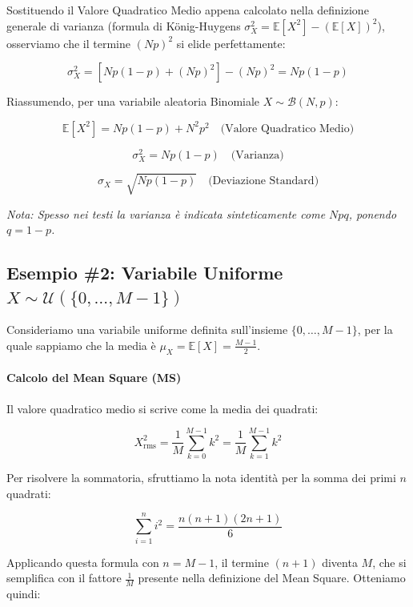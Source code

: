 Sostituendo il Valore Quadratico Medio appena calcolato nella definizione generale di varianza (formula di König-Huygens $\sigma_X^2 = \mathbb{E}[X^2] - (\mathbb{E}[X])^2$), osserviamo che il termine $(Np)^2$ si elide perfettamente:

\[
\sigma_X^2 = \left[ Np(1-p) + (Np)^2 \right] - (Np)^2 = Np(1-p)
\]

Riassumendo, per una variabile aleatoria Binomiale $X \sim \mathcal{B}(N, p)$:

\begin{equation}
\boxed{\mathbb{E}[X^2] = Np(1-p) + N^2 p^2} \quad \text{(Valore Quadratico Medio)}
\end{equation}

\begin{equation}
\boxed{\sigma_X^2 = Np(1-p)} \quad \text{(Varianza)}
\end{equation}

\begin{equation}
\boxed{\sigma_X = \sqrt{Np(1-p)}} \quad \text{(Deviazione Standard)}
\end{equation}

\textit{Nota: Spesso nei testi la varianza è indicata sinteticamente come $Npq$, ponendo $q = 1-p$.}
\subsection{Esempio \#2: Variabile Uniforme $X \sim \mathcal{U}(\{0, \dots, M-1\})$}

Consideriamo una variabile uniforme definita sull'insieme $\{0, \dots, M-1\}$, per la quale sappiamo che la media è $\mu_X = \mathbb{E}[X] = \frac{M-1}{2}$.

\paragraph{Calcolo del Mean Square (MS)}
Il valore quadratico medio si scrive come la media dei quadrati:

\[
X^2_{\text{rms}} = \frac{1}{M} \sum_{k=0}^{M-1} k^2 = \frac{1}{M} \sum_{k=1}^{M-1} k^2
\]

Per risolvere la sommatoria, sfruttiamo la nota identità per la somma dei primi $n$ quadrati:

\[
\sum_{i=1}^n i^2 = \frac{n(n+1)(2n+1)}{6}
\]

Applicando questa formula con $n = M-1$, il termine $(n+1)$ diventa $M$, che si semplifica con il fattore $\frac{1}{M}$ presente nella definizione del Mean Square. Otteniamo quindi:

